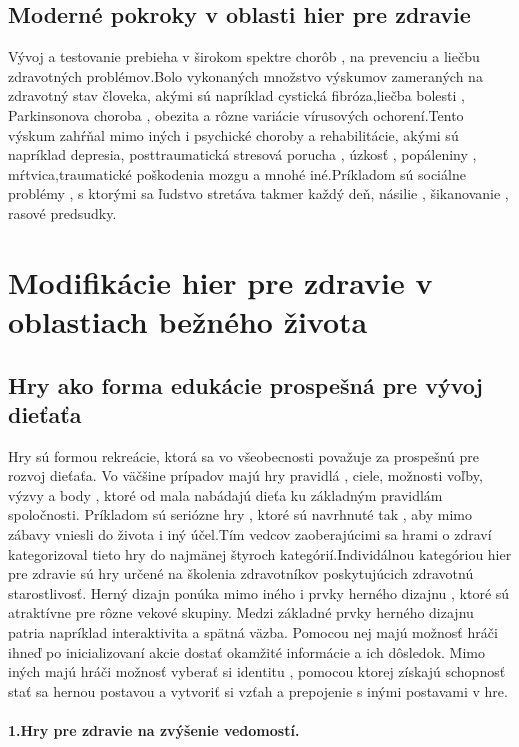 \documentclass[10pt,oneside,slovak,a4paper]{article}
\begin{document}
\subsection{Moderné pokroky v oblasti hier pre zdravie}
Vývoj a testovanie prebieha v širokom spektre chorôb , na prevenciu a liečbu zdravotných problémov.Bolo vykonaných množstvo výskumov zameraných na zdravotný stav človeka, akými sú napríklad cystická fibróza,liečba bolesti , Parkinsonova choroba , obezita a rôzne variácie vírusových ochorení.Tento výskum zahŕňal mimo iných i psychické  choroby a rehabilitácie, akými sú napríklad depresia, posttraumatická stresová porucha , úzkosť , popáleniny , mŕtvica,traumatické poškodenia mozgu a mnohé iné.Príkladom sú sociálne problémy , s ktorými sa ľudstvo stretáva takmer každý deň, násilie , šikanovanie , rasové predsudky\cite{bworld}.
\label{nejaka}
\section{Modifikácie hier pre zdravie v oblastiach bežného života}

\subsection{Hry ako forma edukácie prospešná pre vývoj dieťaťa}
Hry sú formou rekreácie, ktorá sa vo všeobecnosti považuje za prospešnú pre rozvoj dieťaťa. Vo väčšine prípadov majú hry pravidlá , ciele, možnosti voľby, výzvy a body , ktoré od mala nabádajú dieťa ku základným pravidlám spoločnosti. Príkladom sú seriózne hry , ktoré sú navrhnuté tak , aby mimo zábavy vniesli do života i iný účel.Tím vedcov zaoberajúcimi sa hrami o zdraví kategorizoval tieto hry do najmänej štyroch kategórií.Individálnou kategóriou hier pre zdravie sú hry určené na školenia zdravotníkov poskytujúcich zdravotnú starostlivosť. Herný dizajn ponúka mimo iného i prvky herného dizajnu , ktoré sú atraktívne pre rôzne vekové skupiny. Medzi základné prvky herného dizajnu patria napríklad interaktivita a spätná väzba. Pomocou nej majú možnosť hráči ihneď po inicializovaní akcie dostať okamžité informácie a ich dôsledok. Mimo iných majú hráči možnosť vyberať si identitu , pomocou ktorej získajú schopnosť stať sa hernou postavou a vytvoriť si vzťah a prepojenie s inými postavami v hre.
\paragraph{1.Hry pre zdravie na zvýšenie vedomostí.}
\end{document}
